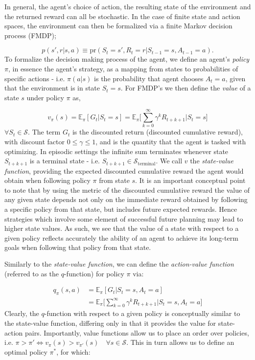 \documentclass[twocolumn,preprintnumbers,amsmath,amssymb,notitlepage,nofootinbib,longbibliography,superscriptaddress,aps,pra,10pt]{revtex4-1}
\begin{document}
	In general, the agent's choice of action, the resulting state of the environment and the returned reward can all be stochastic. In the case of finite state and action spaces, the environment can then be formalized via a finite Markov decision process (FMDP);

	\begin{equation}
		p(s',r|s,a) \equiv \mathrm{pr}(S_t = s',R_t = r|S_{t-1} = s, A_{t-1} = a).
	\end{equation}
	To formalize the decision making process of the agent, we define an agent's \textit{policy} $\pi$, in essence the agent's strategy, as a mapping from states to probabilities of specific actions - i.e. $\pi(a|s)$ is the probability that agent chooses $A_t = a$, given that the environment is in state $S_t = s$.
	For FMDP's we then define the \textit{value} of a state $s$ under policy $\pi$ as,

	\begin{equation}
		v_{\pi}(s) = \mathbb{E}_{\pi}[G_t|S_t = s]  = \mathbb{E}_{\pi} \Big[\sum_{k = 0}^{\infty}\gamma^k R_{t+k+1}\Big| S_t = s \Big] 
	\end{equation}
	$\forall S_t \in \mathcal{S}$. 
	The term $G_t$ is the discounted return (discounted cumulative reward), with discount factor $0 \leq \gamma \leq 1$, and is the quantity that the agent is tasked with optimizing.
	In episodic settings the infinite sum terminates whenever state $S_{t+k+1}$ is a terminal state - i.e. $S_{t+k+1} \in \mathcal{S}_{\mathrm{terminal}}$.
	We call $v$ the \textit{state-value function}, providing the expected discounted cumulative reward the agent would obtain when following policy $\pi$ from state $s$.
	It is an important conceptual point to note that by using the metric of the discounted cumulative reward the value of any given state depends not only on the immediate reward obtained by following a specific policy from that state, but includes future expected rewards.
	Hence strategies which involve some element of successful future planning may lead to higher state values.
	As such, we see that the value of a state with respect to a given policy reflects accurately the ability of an agent to achieve its long-term goals when following that policy from that state. 

	Similarly to the \textit{state-value function}, we can define the \textit{action-value function}  (referred to as the $q$-function) for policy $\pi$ via:

	\begin{align}
		q_{\pi}(s,a) &= \mathbb{E}_{\pi}[G_t|S_t = s, A_t = a]  \\
		& = \mathbb{E}_{\pi} \Big[\sum_{k = 0}^{\infty}\gamma^k R_{t+k+1}\Big| S_t = s, A_t = a \Big]
	\end{align}
	Clearly, the $q$-function with respect to a given policy is conceptually similar to the state-value function, differing only in that it provides the value for state-action pairs.
	Importantly, value functions allow us to place an order over policies, i.e. $\pi > \pi' \iff v_{\pi}(s) > v_{\pi'}(s)\quad \forall s \in \mathcal{S} $.
	This in turn allows us to define an optimal policy $\pi^*$, for which:
\end{document}
